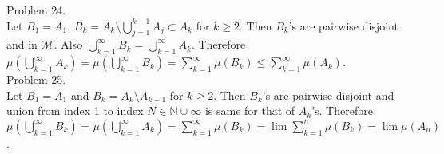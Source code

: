 Problem 24. \\

Let $B_1 = A_1 $, $B_k = A_k \setminus \bigcup_{j=1}^{k-1}A_j \subset A_k$ for $k\geq 2$. Then $B_k$'s are pairwise disjoint and in $\mathcal{M}$. Also $\bigcup_{k=1}^{\infty}B_k = \bigcup_{k=1}^{\infty}A_k$.
Therefore $\mu \left( \bigcup_{k=1}^{\infty} A_k  \right) = \mu \left( \bigcup_{k=1}^{\infty} B_k  \right) = \sum_{k=1}^{\infty} \mu\left( B_k \right) \leq \sum_{k=1 }^{\infty}\mu\left( A_k \right)$. \\

Problem 25. \\

Let $B_1 = A_1$ and $B_k = A_k \setminus A_{k-1}$ for $k \geq 2$. Then $B_k$'s are pairwise disjoint and union from index 1 to index $N \in \mathbb{N} \cup \infty $ is same for that of $A_k$'s.
Therefore $\mu\left( \bigcup_{k=1}^{\infty}B_k  \right) = \mu\left( \bigcup_{k=1}^{\infty}A_k \right) = \sum_{k=1}^{\infty}\mu\left( B_k \right) = \lim \sum_{k=1}^n \mu\left( B_k \right) = \lim \mu\left( A_n \right)$. \\
